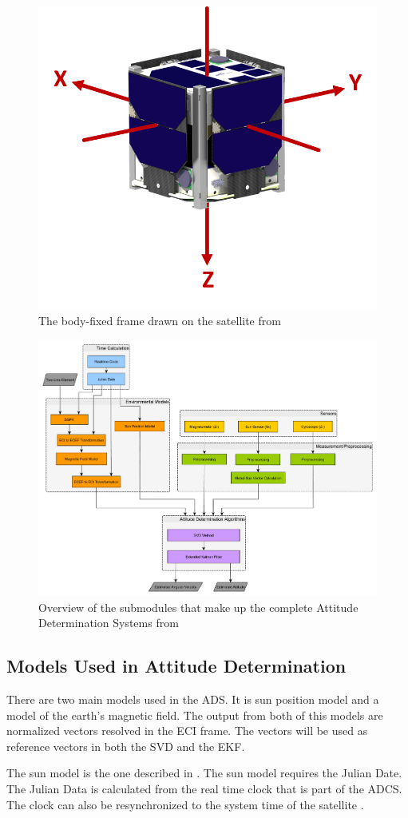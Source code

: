 \begin{figure}[tbp]
	\centering
	\includegraphics[width=0.6\columnwidth]{./Pictures/GBF_new}
	\caption{The body-fixed frame drawn on the satellite from \cite{DavidThesis}}
	\label{fig:bodyFix}
\end{figure} 

\begin{figure}[tbp]
	\centering
	\includegraphics[width=0.5\columnwidth]{./Pictures/ATTDET_Architecture_new}
	\caption{Overview of the submodules that make up the complete Attitude Determination Systems from \cite{DavidThesis}}
	\label{fig:ADS_overview}
\end{figure}            

\subsection{Models Used in Attitude Determination}\label{subsec:ModelADS}
There are two main models used in the ADS. It is sun position model and a model of the earth's magnetic field. The output from both of this models are normalized vectors resolved in the ECI frame. The vectors will be used as reference vectors in both the SVD and the EKF. 

The sun model is the one described in \cite{AstroPC}. The sun model requires the Julian Date. The Julian Data is calculated from the real time clock that is part of the ADCS. The clock can also be resynchronized to the system time of the satellite \cite{DavidThesis}. 

